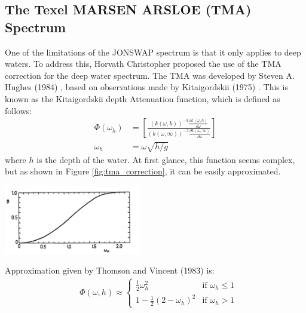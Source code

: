 \subsection{The Texel MARSEN ARSLOE (TMA) Spectrum}
One of the limitations of the JONSWAP spectrum is that it only applies to deep waters. To address this, Horvath Christopher \cite{horvath2015} proposed the use of the TMA correction for the deep water spectrum. The TMA was developed by Steven A. Hughes (1984) \cite{hughes1984}, based on observations made by Kitaigordskii (1975) \cite{kitaigordskii1975}. This is known as the Kitaigordskii depth Attenuation function, which is defined as follows:
\begin{equation}
    \begin{aligned}
        \Phi(\omega_h) &= \left[ \frac{(k(\omega, k))^{-3}\frac{\partial k(\omega, h)}{\partial \omega}}{(k(\omega, \infty ))^{-3}\frac{\partial k(\omega, \infty)}{\partial \omega}} \right] \\
        \omega_h &= \omega \sqrt{h/g}
    \end{aligned}
\end{equation}
where $h$ is the depth of the water. At first glance, this function seems complex, but as shown in Figure \ref{fig:tma_correction}, it can be easily approximated.

\begin{minipage}{1\textwidth}
    \centering
    \includegraphics[width=0.45\textwidth]{"images/tma_correction.png"}
    \label{fig:tma_correction}
\end{minipage}

Approximation given by Thomson and Vincent (1983) \cite{thompson1983} is:
\begin{equation}
    \begin{aligned}
        &\Phi(\omega, h) \approx
        \begin{cases} 
        \frac{1}{2} \omega_h^{2} & \text{if } \omega_h \leq 1 \\
        1 - \frac{1}{2}(2 - \omega_h)^{2} & \text{if } \omega_h > 1
        \end{cases}
    \end{aligned}
\end{equation}

